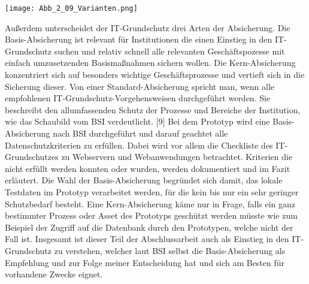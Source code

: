 \texttt{[image: Abb\_2\_09\_Varianten.png]}

Außerdem unterscheidet der IT-Grundschutz drei Arten der Absicherung. Die Basis-Absicherung ist relevant für Institutionen die einen Einstieg in den IT-Grundschutz suchen und relativ schnell alle relevanten Geschäftspozesse mit einfach umzusetzenden Basismaßnahmen sichern wollen. Die Kern-Absicherung konzentriert sich auf besonders wichtige Geschäftsprozesse und vertieft sich in die Sicherung dieser. Von einer Standard-Absicherung spricht man, wenn alle empfohlenen IT-Grundschutz-Vorgehensweisen durchgeführt werden. Sie beschreibt den allumfassenden Schutz der Prozesse und Bereiche der Institution, wie das Schaubild vom BSI verdeutlicht. [9] Bei dem Prototyp wird eine Basis-Absicherung nach BSI durchgeführt und darauf geachtet alle Datenschutzkriterien zu erfüllen. Dabei wird vor allem die Checkliste des IT-Grundschutzes zu Webservern und Webanwendungen betrachtet. Kriterien die nicht erfüllt werden konnten oder wurden, werden dokumentiert und im Fazit erläutert. Die Wahl der Basis-Absicherung begründet sich damit, das lokale Testdaten im Prototyp verarbeitet werden, für die kein bis nur ein sehr geringer Schutzbedarf besteht. Eine Kern-Absicherung käme nur in Frage, falls ein ganz bestimmter Prozess oder Asset des Prototyps geschützt werden müsste wie zum Beispiel der Zugriff auf die Datenbank durch den Prototypen, welche nicht der Fall ist. Insgesamt ist dieser Teil der Abschlussarbeit auch als Einstieg in den IT-Grundschutz zu verstehen, welcher laut BSI selbst die Basis-Absicherung als Empfehlung und zur Folge meiner Entscheidung hat und sich am Besten für vorhandene Zwecke eignet.

